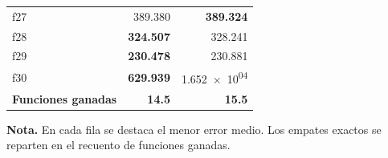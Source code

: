 \begin{table}[H]
{\begin{tabular}{lrr}
f27 & \num{389.380} & \textbf{\num{389.324}} \\
f28 & \textbf{\num{324.507}} & \num{328.241} \\
f29 & \textbf{\num{230.478}} & \num{230.881} \\
f30 & \textbf{\num{629.939}} & \num{1.652e+04} \\
\midrule
\textbf{Funciones ganadas} & \textbf{14.5} & \textbf{15.5} \\
\bottomrule
\end{tabular}}
\vspace{2pt}
\begin{flushleft}\small
\textbf{Nota.} En cada fila se destaca el menor error medio. Los empates exactos se reparten en el recuento de funciones ganadas.
\end{flushleft}
\end{table}
